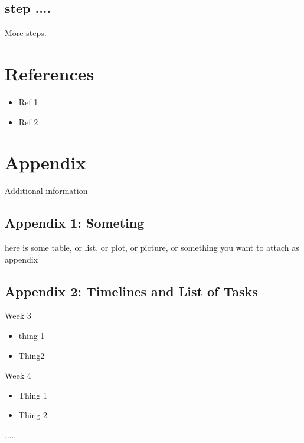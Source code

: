 \documentclass[paper=a4, fontsize=11pt]{scrartcl}
\numberwithin{equation}{section}		%
\numberwithin{figure}{section}			%
\numberwithin{table}{section}				%
\begin{document}
\subsection{step ....}
More steps.


\section{\textbf{References}}
\begin{itemize}
\item 
Ref 1
\item
Ref 2
\end{itemize}



\section{\textbf{Appendix}}
Additional information
\subsection{Appendix 1: Someting}
here is some table, or list, or plot, or picture, or something you want to attach as appendix

\subsection{Appendix 2: Timelines and List of Tasks}
Week 3
						
\begin{itemize}
\item 
thing 1
\item
Thing2
\end{itemize}					
Week 4
\begin{itemize}
\item
Thing 1
\item
Thing 2
\end{itemize}								
.....
								

\end{document}
